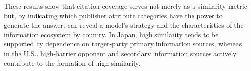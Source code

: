 These results show that citation coverage serves not merely as a similarity metric but, by indicating which publisher attribute categories have the power to generate the answer, can reveal a model's strategy and the characteristics of the information ecosystem by country.
In Japan, high similarity tends to be supported by dependence on target-party primary information sources, whereas in the U.S., high-barrier opponent and secondary information sources actively contribute to the formation of high similarity.
